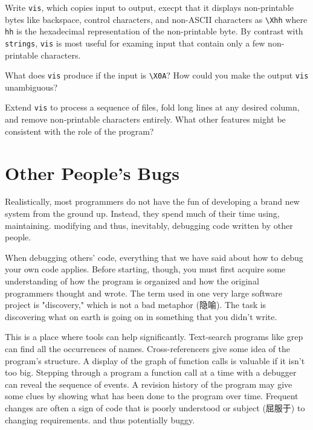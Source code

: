 \begin{exercise}
    Write \verb'vis', which copies input to output, execpt that it displays
    non-printable bytes like backspace, control characters, and non-ASCII
    characters as \verb'\Xhh' where \verb'hh' is the hexadecimal
    representation of the non-printable byte. By contrast with
    \verb'strings', \verb'vis' is most useful for examing input that
    contain only a few non-printable characters.
\end{exercise}

\begin{exercise}
    What does \verb'vis' produce if the input is \verb'\X0A'? How could you
    make the output \verb'vis' unambiguous?
\end{exercise}

\begin{exercise}
    Extend \verb'vis' to process a sequence of files, fold long lines at
    any desired column, and remove non-printable characters entirely.
    What other features might be consistent with the role of the program?
\end{exercise}

\section{Other People's Bugs}

Realistically, most programmers do not have the fun of developing a brand
new system from the ground up. Instead, they spend much of their time
using, maintaining. modifying and thus, inevitably, debugging code written
by other people.

When debugging others' code, everything that we have said about how to
debug your own code applies. Before starting, though, you must first
acquire some understanding of how the program is organized and how the
original programmers thought and wrote. The term used in one very large
software project is "discovery," which is not a bad metaphor (隐喻). The
task is discovering what on earth is going on in something that you didn't
write.

This is a place where tools can help significantly. Text-search programs
like grep can find all the occurrences of names. Cross-referencers give
some idea of the program's structure. A display of the graph of function
calls is valuable if it isn't too big. Stepping through a program a
function call at a time with a debugger can reveal the sequence of events.
A revision history of the program may give some clues by showing what has
been done to the program over time. Frequent changes are often a sign of
code that is poorly understood or subject (屈服于) to changing
requirements.  and thus potentially buggy.

